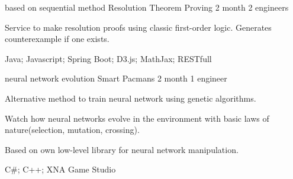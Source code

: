 
\begin{cventries}


  \cventry
    {based on sequential method}
    {Resolution Theorem Proving}
    {2 month}
    {2 engineers}
    {
      \begin{cvitems}
        \item {Service to make resolution proofs using classic first-order logic. Generates counterexample if one exists.}
        \item {Java; Javascript; Spring Boot; D3.js; MathJax; RESTfull}
      \end{cvitems}
    }
  \cventry
    {neural network evolution}
    {Smart Pacmans}
    {2 month}
    {1 engineer}
    {
      \begin{cvitems}
        \item {Alternative method to train neural network using genetic algorithms.}
        \item {Watch how neural networks evolve in the environment with basic laws of nature(selection, mutation, crossing).}
        \item {Based on own low-level library for neural network manipulation.}
        \item {C\#; C++; XNA Game Studio}
      \end{cvitems}
    }
\end{cventries}
